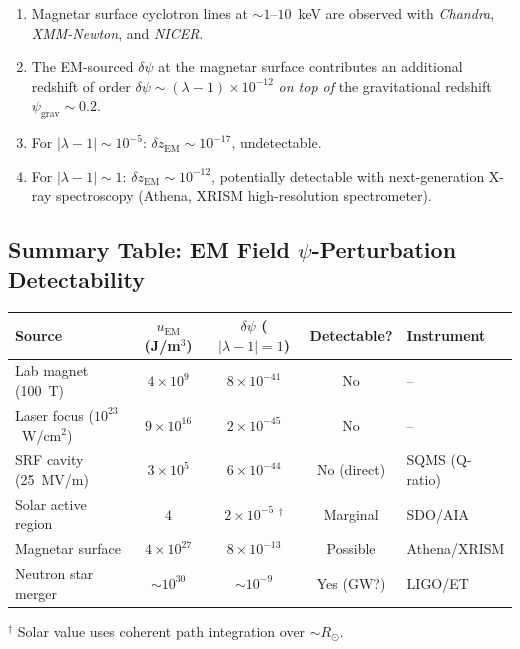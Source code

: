 \documentclass[11pt]{article}
\newcommand{\ee}[1]{\times 10^{#1}}
\newcommand{\lam}{\lambda}
\newcommand{\lbone}{|\lambda - 1|}
\newcommand{\dpsi}{\delta\psi}
\begin{document}
\begin{enumerate}
\item Magnetar surface cyclotron lines at $\sim 1$--$10$~keV are
observed with \textit{Chandra}, \textit{XMM-Newton}, and \textit{NICER}.

\item The EM-sourced $\dpsi$ at the magnetar surface contributes an
additional redshift of order $\dpsi \sim (\lam-1) \times 10^{-12}$
\textit{on top of} the gravitational redshift $\psi_{\text{grav}}
\sim 0.2$.

\item For $\lbone \sim 10^{-5}$: $\delta z_{\text{EM}} \sim 10^{-17}$,
undetectable.

\item For $\lbone \sim 1$: $\delta z_{\text{EM}} \sim 10^{-12}$,
potentially detectable with next-generation X-ray spectroscopy
(Athena, XRISM high-resolution spectrometer).
\end{enumerate}

\subsection{Summary Table: EM Field $\psi$-Perturbation Detectability}

\begin{center}
\begin{tabular}{lcccl}
\toprule
\textbf{Source} & $u_{\text{EM}}$ (J/m$^3$) & $\dpsi$ ($\lbone = 1$)
& \textbf{Detectable?} & \textbf{Instrument} \\
\midrule
Lab magnet (100~T) & $4\ee{9}$ & $8\ee{-41}$ & No & -- \\
Laser focus ($10^{23}$~W/cm$^2$) & $9\ee{16}$ & $2\ee{-45}$ & No & -- \\
SRF cavity (25~MV/m) & $3\ee{5}$ & $6\ee{-44}$ & No (direct) & SQMS (Q-ratio) \\
Solar active region & $4$ & $2\ee{-5}$ $^\dagger$ & Marginal & SDO/AIA \\
Magnetar surface & $4\ee{27}$ & $8\ee{-13}$ & Possible & Athena/XRISM \\
Neutron star merger & $\sim 10^{30}$ & $\sim 10^{-9}$ & Yes (GW?) & LIGO/ET \\
\bottomrule
\end{tabular}
\end{center}
$^\dagger$ Solar value uses coherent path integration over $\sim R_\odot$.


\end{document}
